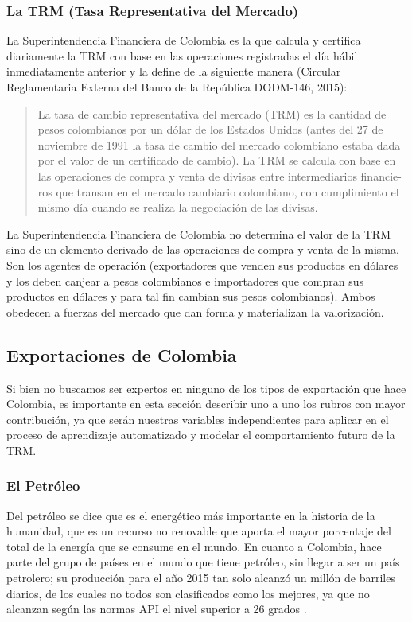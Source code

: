 \subsubsection{La TRM (Tasa Representativa del Mercado)}
La Superintendencia Financiera de Colombia es la que calcula y certifica diariamente la TRM con base en las operaciones registradas el día hábil inmediatamente  anterior  y  la  define  de  la  siguiente  manera  (Circular  Reglamentaria Externa del Banco de la República DODM-146, 2015):

	\begin{quote}La  tasa  de  cambio  representativa  del  mercado  (TRM)  es  la  cantidad de pesos colombianos por un dólar de los Estados Unidos (antes del 27 de noviembre de 1991 la tasa de cambio del mercado colombiano estaba dada por el valor de un certificado de cambio). La TRM se calcula con base en las operaciones de compra y venta de divisas entre intermediarios financie-ros que transan en el mercado cambiario colombiano, con cumplimiento el mismo día cuando se realiza la negociación de las divisas.
	\end{quote}

La Superintendencia Financiera de Colombia no determina el valor de la TRM sino de un elemento derivado de las operaciones de compra y venta de la misma. Son los agentes de operación (exportadores que venden sus productos en dólares y los deben canjear a pesos colombianos e importadores que compran sus productos en dólares y para tal fin cambian sus pesos colombianos). Ambos obedecen a fuerzas del mercado que dan forma y materializan la valorización.

\subsection{Exportaciones de Colombia}
Si bien no buscamos ser expertos en ninguno de los tipos de exportación que hace Colombia, es importante en esta sección describir uno a uno los rubros con mayor contribución, ya que serán nuestras variables independientes para aplicar en el proceso de aprendizaje automatizado y modelar el comportamiento futuro de la TRM.

\subsubsection{El Petróleo}
Del petróleo se dice que es el energético más importante en la historia de la humanidad, que es un recurso no renovable que aporta el mayor porcentaje del total de la energía que se consume en el mundo. En cuanto a Colombia, hace parte del grupo de países en el mundo que tiene petróleo, sin llegar a ser un país petrolero; su producción para el año 2015 tan solo alcanzó un millón de barriles diarios, de los cuales no todos son clasificados como los mejores, ya que no alcanzan según las normas API el nivel superior a 26 grados \cite{cardenas}.

